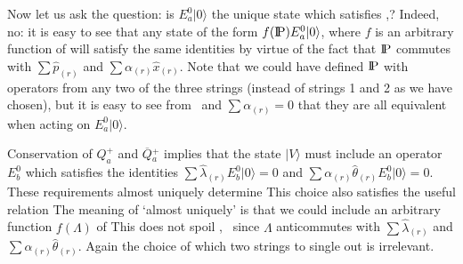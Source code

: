 Now let us ask the question:  is $E_a^0|0\rangle$ the
unique state which satisfies
\breqone,\breqtwo?
Indeed, no:
it is easy to see that any state of the form
$f(\relax{\rm I\kern-.18em P}) E_a^0 |0\rangle$, where $f$ is an arbitrary function of
\eqn{}
will satisfy the same identities by virtue of the fact that
$\relax{\rm I\kern-.18em P}$ commutes with $\sum \hat{p}_{(r)}$ and $\sum \alpha_{(r)}
\hat{x}_{(r)}$.  Note that we could have defined $\relax{\rm I\kern-.18em P}$ with operators
from any two of the three strings (instead
of strings 1 and 2 as we have chosen), but it is easy to see from
\breqone\ and $\sum \alpha_{(r)} = 0$ that they are all 
equivalent when acting on $E_a^0 |0\rangle$.


Conservation of $Q^+_a$ and $\overline{Q}{}^+_a$ implies that the
state $|V\rangle$ must include an operator $E_b^0$ which satisfies
the identities
$\sum \hat{\lambda}_{(r)} E_b^0|0\rangle = 0$ and
$\sum \alpha_{(r)} \hat{\theta}_{(r)} E_b^0|0\rangle = 0$.
These requirements almost uniquely determine
\eqn{}
This choice also satisfies the useful relation
\eqn{}
The meaning of `almost uniquely' is that we
could include an arbitrary function $f(\Lambda)$ of
\eqn{}
This does not spoil
\freqone, \freqtwo\ since $\Lambda$
anticommutes with $\sum \hat{\lambda}_{(r)}$ and
$\sum \alpha_{(r)} \hat{\theta}_{(r)}$. Again the choice
of which two strings to single out is irrelevant.



